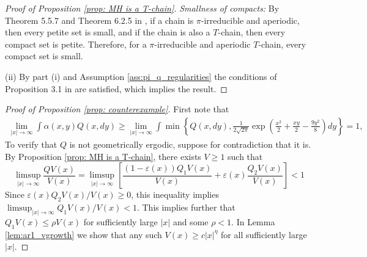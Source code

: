 \documentclass{article}
\theoremstyle{definition}
\theoremstyle{plain}
\begin{document}
\begin{proof}[Proof of Proposition \ref{prop: MH is a T-chain}]
\textit{Smallness of compacts:}
By Theorem 5.5.7 and Theorem 6.2.5 in \cite{meyn2012markov}, if a chain is $\pi$-irreducible and aperiodic, then every petite set is small, and if the chain is also a $T$-chain, then every compact set is petite. Therefore, for a  $\pi$-irreducible and aperiodic $T$-chain, every compact set is small.

(ii) By part (i) and Assumption \ref{ass:pi_q_regularities} the conditions of Proposition 3.1 in \cite{roberts1996geometric} are satisfied, which implies the result.
\end{proof}


\begin{proof}[Proof of Proposition \ref{prop: counterexample}]
First note that
\begin{align*}
   \lim_{|x|\to\infty} \int\alpha(x,y) Q(x,dy)
    \ge \lim_{|x|\to\infty}\int \min\left\{Q(x,dy),\frac{1}{2\sqrt{2\pi}}\exp\left(\frac{x^2}{2}+\frac{xy}{2}-\frac{9y^2}{8}\right)dy\right\}= 1,
\end{align*}
To verify that $Q$ is not geometrically ergodic, suppose for contradiction that it is. By Proposition \ref{prop: MH is a T-chain}, there exists $V\ge1$ such that 
\[
\limsup_{|x|\to\infty}\frac{QV(x)}{V(x)} = \limsup_{|x|\to\infty} \left[\frac{(1-\varepsilon(x))Q_1V(x)}{V(x)} + \varepsilon(x)\frac{Q_2V(x)}{V(x)}\right]<1
\]
Since $\varepsilon(x)Q_2V(x)/V(x)\ge 0$, this inequality implies $\limsup_{|x|\to\infty}Q_1V(x)/V(x)<1$.  This implies further that $Q_1V(x) \leq \rho V(x)$ for sufficiently large $|x|$ and some $\rho < 1$.  In Lemma \ref{lem:ar1_vgrowth} we show that any such $V(x) \geq c|x|^\eta$ for all sufficiently large $|x|$. 

\end{proof}
\end{document}
